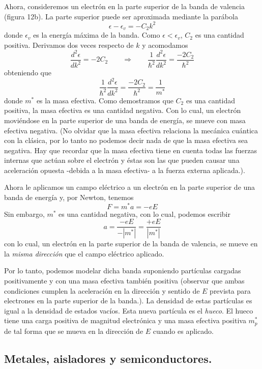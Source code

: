\documentclass[12pt,a4paper]{article}
\begin{document}
Ahora, consideremos un electrón en la parte superior de la banda de valencia (figura 12b). La parte superior puede ser aproximada mediante la parábola
\[ \epsilon - \epsilon _{v}= -C_{2} k^{2} \]
donde $\epsilon _{v}$ es la energía máxima de la banda. Como $\epsilon < \epsilon _{v}$, $C_{2}$ es una cantidad positiva. Derivamos dos veces respecto de $k$ y acomodamos
\[ \frac{d^{2} \epsilon}{dk^{2}} = -2C_{2} \qquad \Rightarrow \qquad \frac{1}{\hbar^{2}} \frac{d^{2} \epsilon}{dk^{2}} = \frac{-2C_{2}}{\hbar^{2}} \]
obteniendo que
\[ \frac{1}{\hbar^{2}} \frac{d^{2} \epsilon}{dk^{2}} = \frac{-2C_{2}}{\hbar^{2}} = \frac{1}{m^{\ast}} \]
donde $m^{\ast}$ es la masa efectiva. Como demostramos que $C_{2}$ es una cantidad positiva, la masa efectiva es una cantidad negativa. Con lo cual, un electrón moviéndose en la parte superior de una banda de energía, se mueve con masa efectiva negativa. (No olvidar que la masa efectiva relaciona la mecánica cuántica con la clásica, por lo tanto no podemos decir nada de que la masa efectiva sea negativa. Hay que recordar que la masa efectiva tiene en cuenta todas las fuerzas internas que actúan sobre el electrón y éstas son las que pueden causar una aceleración opuesta -debida a la masa efectiva- a la fuerza externa aplicada.).

Ahora le aplicamos un campo eléctrico a un electrón en la parte superior de una banda de energía y, por Newton, tenemos
\[ F= m^{\ast} a = -eE \]
Sin embargo, $m^{\ast}$ es una cantidad negativa, con lo cual, podemos escribir
\[ a=\frac{-eE}{-|m^{\ast}|}=\frac{+eE}{|m^{\ast}|} \]
con lo cual, un electrón en la parte superior de la banda de valencia, se mueve en la \emph{misma dirección} que el campo eléctrico aplicado.

Por lo tanto, podemos modelar dicha banda suponiendo partículas cargadas positivamente y con una masa efectiva también positiva (observar que ambas condiciones cumplen la aceleración en la dirección y sentido de $E$ prevista para electrones en la parte superior de la banda.). La densidad de estas partículas es igual a la densidad de estados vacíos. Esta nueva partícula es el \emph{hueco}. El hueco tiene una carga positiva de magnitud electrónica y una masa efectiva positiva $m_{p}^{\ast}$ de tal forma que se mueva en la dirección de $E$ cuando es aplicado.

\subsection{Metales, aisladores y semiconductores.}
\end{document}
